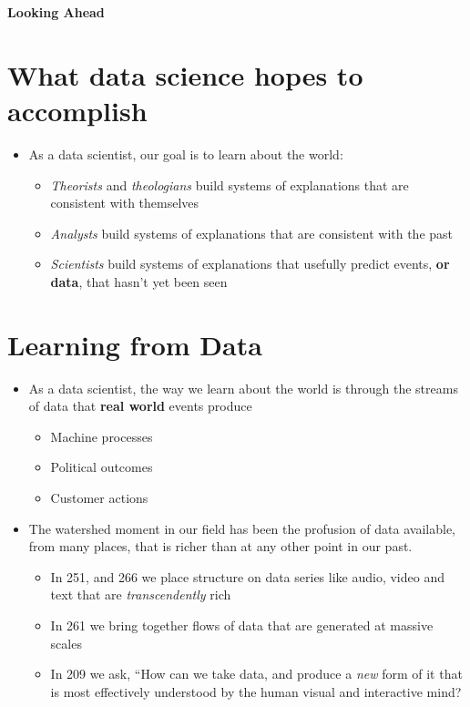 \documentclass[
]{book}
\providecommand{\tightlist}{%
  \setlength{\itemsep}{0pt}\setlength{\parskip}{0pt}}
\theoremstyle{definition}
\theoremstyle{definition}
\theoremstyle{definition}
\theoremstyle{definition}
\theoremstyle{remark}
\begin{document}
\textbf{Looking Ahead}

\hypertarget{what-data-science-hopes-to-accomplish}{%
\section{What data science hopes to accomplish}\label{what-data-science-hopes-to-accomplish}}

\begin{itemize}
\tightlist
\item
  As a data scientist, our goal is to learn about the world:

  \begin{itemize}
  \tightlist
  \item
    \emph{Theorists} and \emph{theologians} build systems of explanations that are consistent with themselves
  \item
    \emph{Analysts} build systems of explanations that are consistent with the past
  \item
    \emph{Scientists} build systems of explanations that usefully predict events, \textbf{or data}, that hasn't yet been seen
  \end{itemize}
\end{itemize}

\hypertarget{learning-from-data}{%
\section{Learning from Data}\label{learning-from-data}}

\begin{itemize}
\tightlist
\item
  As a data scientist, the way we learn about the world is through the streams of data that \textbf{real world} events produce

  \begin{itemize}
  \tightlist
  \item
    Machine processes
  \item
    Political outcomes
  \item
    Customer actions
  \end{itemize}
\item
  The watershed moment in our field has been the profusion of data available, from many places, that is richer than at any other point in our past.

  \begin{itemize}
  \tightlist
  \item
    In 251, and 266 we place structure on data series like audio, video and text that are \emph{transcendently} rich
  \item
    In 261 we bring together flows of data that are generated at massive scales
  \item
    In 209 we ask, ``How can we take data, and produce a \emph{new} form of it that is most effectively understood by the human visual and interactive mind?
  \end{itemize}
\end{itemize}
\end{document}
